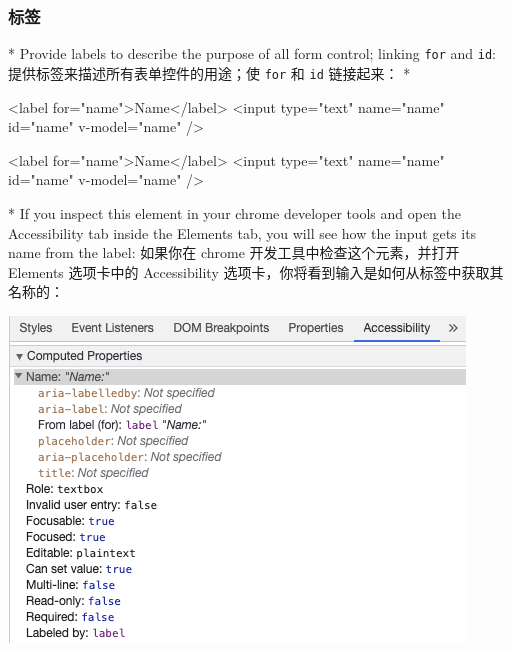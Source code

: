 \begin{paracol}{2}
\subsubsection{标签}
\switchcolumn[0]*%
Provide labels to describe the purpose of all form control; linking
\texttt{for} and \texttt{id}:
\switchcolumn
提供标签来描述所有表单控件的用途；使 \texttt{for} 和 \texttt{id}
链接起来：
\switchcolumn[0]*%
\begin{codeHtml}
<label for="name">Name</label>
<input type="text" name="name" id="name" v-model="name" />
\end{codeHtml}
\switchcolumn
\begin{codeHtml}
<label for="name">Name</label>
<input type="text" name="name" id="name" v-model="name" />
\end{codeHtml}
\switchcolumn[0]*%
If you inspect this element in your chrome developer tools and open the
Accessibility tab inside the Elements tab, you will see how the input
gets its name from the label:
\switchcolumn
如果你在 chrome 开发工具中检查这个元素，并打开 Elements 选项卡中的
Accessibility 选项卡，你将看到输入是如何从标签中获取其名称的：
\end{paracol}

\begin{center} 
\includegraphics{./img/AccessibleLabelChromeDevTools.8d40e8fa.png} 
\end{center}
    

